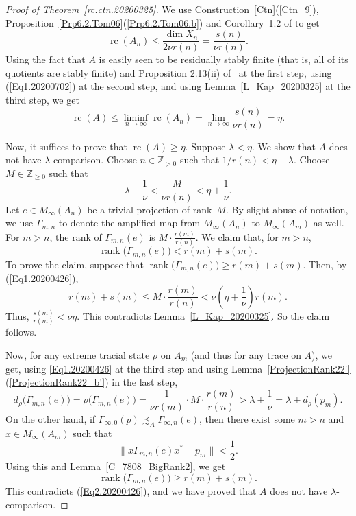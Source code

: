 \documentclass[10pt]{amsart}
\numberwithin{equation}{section}
\theoremstyle{definition}
\newcommand{\N}{{\mathbb{Z}}_{> 0}}
\newcommand{\Nz}{{\mathbb{Z}}_{\geq 0}}
\newcommand{\rank}{{\operatorname{rank}}}
\newcommand{\rc}{{\operatorname{rc}}}
\newcommand{\pj}{projection}
\newcommand{\Lem}[1]{Lemma~\ref{#1}}
\begin{document}
%
\begin{proof}[Proof of Theorem~\ref{rc.ctn.20200325}]
We  use Construction~\ref{Ctn}(\ref{Ctn_9}), Proposition~\ref{Prp6.2.Tom06}(\ref{Prp6.2.Tom06.b}) and Corollary~1.2 of \cite{EN13} to get 
\begin{equation}
\label{Eq1.20200702}
\rc (A_n)\leq \frac{\dim X_n}{2 \nu r(n)} = \frac{s(n)}{\nu r(n)}.
\end{equation}
Using the fact that $A$ is easily seen to be residually stably finite
(that is, all of its quotients are stably finite) and Proposition 2.13(ii) of~\cite{AA20} at the first step,
using (\ref{Eq1.20200702}) at the second step, and using Lemma~\ref{L_Kap_20200325} at the third step, we get 
\[
\rc (A) \leq \liminf_{n \to \infty} \rc (A_n) = \lim_{n \to \infty} \frac{s(n)}{\nu r(n)} =\eta.
\]

Now, it suffices to prove that
$\rc (A) \geq \eta$.
Suppose $\lambda < \eta$.
We show that $A$ does not have $\lambda$-comparison.
Choose $n \in \N$ such that $1 / {r (n)} < \eta - \lambda$.
Choose $M \in \Nz$ such that
\begin{equation}\label{Eq1.20200426}
\lambda + \frac{1}{\nu}
 < \frac{M}{ \nu r (n)}
 < \eta + \frac{1}{\nu}.
 \end{equation}
Let $e \in M_{\infty} (A_n)$ be a trivial \pj{}
of rank~$M$.
By slight abuse of notation,
we use $\Gamma_{m, n}$ to denote the amplified map
from $M_{\infty} (A_n)$ to $M_{\infty} (A_m)$ as well.
For $m > n$, the rank of $\Gamma_{m, n} (e)$
is $M \cdot \frac{r (m)}{r (n)}$.
We claim that, for $m > n$,
\begin{equation}\label{Eq2.20200426}
\rank \big(\Gamma_{m, n} (e) \big) < r (m) +  s(m).
\end{equation}
To prove the claim, suppose that
$\rank \big( \Gamma_{m, n} (e) \big) \geq  r (m) +  s(m)$.
Then, by (\ref{Eq1.20200426}),
\[
 r (m) + s(m) \leq M \cdot \frac{r (m)}{r (n)} < \nu \left(\eta + \frac{1}{\nu}\right) r (m).
\]
Thus, $\frac{s(m)}{r(m)} < \nu \eta$. This contradicts Lemma~\ref{L_Kap_20200325}. 
So the claim follows.

Now, for any extreme tracial state $\rho$ on $A_m$
(and thus for any trace on $A$),
we get, using \ref{Eq1.20200426} at the third step and  using \Lem{ProjectionRank22'}(\ref{ProjectionRank22_b'})
in the last step,
\begin{equation*}
d_{\rho} \big(\Gamma_{m, n} (e)\big)
 = \rho \big(\Gamma_{m, n} (e)\big)
 = \frac{1}{\nu r (m)} \cdot M \cdot \frac{r (m)}{r (n)}
> \lambda + \frac{1}{\nu}
= 
 \lambda + d_{\rho} (p_{m}).
\end{equation*}
On the other hand, if
$\Gamma_{\infty, 0} (p) \precsim_A \Gamma_{\infty, n} (e)$,
then there exist some $m > n$
and $x \in M_{\infty} (A_m)$
such that 
\[
\|x \Gamma_{m, n} (e)x^* - p_m\| < \frac{1}{2}.
\]
Using this and Lemma~\ref{C_7808_BigRank2}, we get
\[
\rank \big(\Gamma_{m,n} (e)\big) \geq r (m) + s (m).
\]
This contradicts (\ref{Eq2.20200426}), and we have proved that
$A$ does not have $\lambda$-comparison.
\end{proof}
\end{document}
